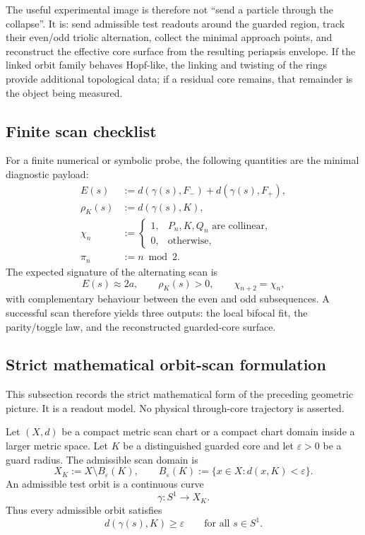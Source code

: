 \begin{remark}
\label{rem:operational-meaning-triolic-orbit-scan}
The useful experimental image is therefore not ``send a particle through the collapse''.  It is: send admissible test readouts around the guarded region, track their even/odd triolic alternation, collect the minimal approach points, and reconstruct the effective core surface from the resulting periapsis envelope.  If the linked orbit family behaves Hopf-like, the linking and twisting of the rings provide additional topological data; if a residual core remains, that remainder is the object being measured.
\end{remark}

\subsection{Finite scan checklist}
\label{subsec:finite-scan-checklist}

For a finite numerical or symbolic probe, the following quantities are the minimal diagnostic payload:
\[
\begin{aligned}
E(s)&:=d(\gamma(s),F_-)+d(\gamma(s),F_+),\\
\rho_K(s)&:=d(\gamma(s),K),\\
\chi_n&:=\begin{cases}
1,& P_n,K,Q_n\text{ are collinear},\\
0,& \text{otherwise},
\end{cases}\\
\pi_n&:=n\bmod 2.
\end{aligned}
\]
The expected signature of the alternating scan is
\[
E(s)\approx 2a,
\qquad
\rho_K(s)>0,
\qquad
\chi_{n+2}=\chi_n,
\]
with complementary behaviour between the even and odd subsequences.  A successful scan therefore yields three outputs: the local bifocal fit, the parity/toggle law, and the reconstructed guarded-core surface.


\subsection{Strict mathematical orbit-scan formulation}
\label{subsec:strict-mathematical-orbit-scan-formulation}

This subsection records the strict mathematical form of the preceding geometric picture.  It is a readout model.  No physical through-core trajectory is asserted.

\begin{definition}
\label{def:guarded-scan-space}
Let $(X,d)$ be a compact metric scan chart or a compact chart domain inside a larger metric space.  Let $K$ be a distinguished guarded core and let $\varepsilon>0$ be a guard radius.  The admissible scan domain is
\[
X_K:=X\setminus B_\varepsilon(K),
\qquad
B_\varepsilon(K):=\{x\in X:d(x,K)<\varepsilon\}.
\]
An admissible test orbit is a continuous curve
\[
\gamma:S^1\longrightarrow X_K .
\]
Thus every admissible orbit satisfies
\[
 d(\gamma(s),K)\geq \varepsilon
 \qquad\text{for all }s\in S^1.
\]
\end{definition}

